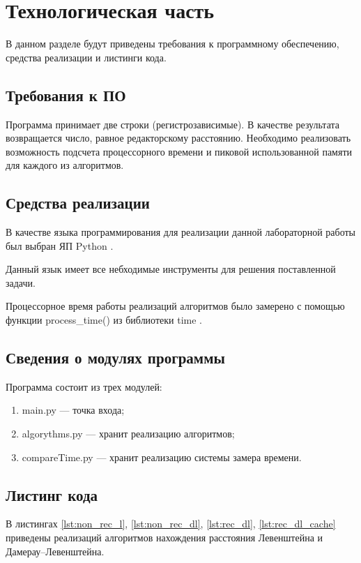 \chapter{Технологическая часть}

В данном разделе будут приведены требования к программному обеспечению, средства реализации и листинги кода.

\section{Требования к ПО}

Программа принимает две строки (регистрозависимые). В качестве результата возвращается число, равное редакторскому расстоянию. Необходимо реализовать возможность подсчета процессорного времени и пиковой использованной памяти для каждого из алго­ритмов.

\section{Средства реализации}

В качестве языка программирования для реализации данной лабораторной работы был выбран ЯП Python \cite{pythonlang}. 

Данный язык имеет все небходимые инструменты для решения поставленной задачи.

Процессорное время работы реализаций алгоритмов было замерено с помощью функции process\_time() из библиотеки time \cite{pythonlangtime}.

\section{Сведения о модулях программы}
Программа состоит из трех модулей:
\begin{enumerate}[label={\arabic*)}]
    \item main.py --- точка входа;
	\item algorythms.py --- хранит реализацию алгоритмов;
	\item compareTime.py --- хранит реализацию системы замера времени.
\end{enumerate}


\section{Листинг кода}

 В листингах \ref{lst:non_rec_l}, \ref{lst:non_rec_dl}, \ref{lst:rec_dl}, \ref{lst:rec_dl_cache} приведены реализаций алгоритмов нахождения расстояния Левенштейна и Дамерау--Левенштейна.

